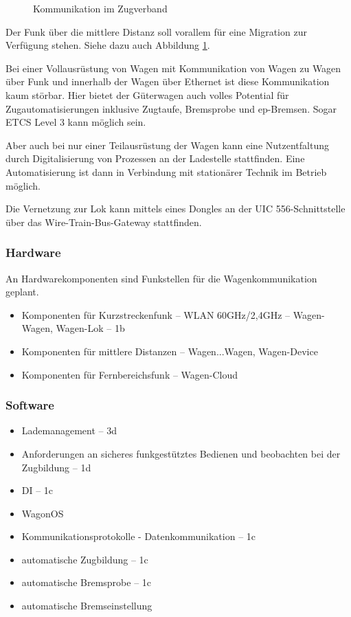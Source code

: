 \begin{figure}[hbt]
    \centering
    
    \caption{Kommunikation im Zugverband\cite{autonBetrieb}}
    \label{fig:Zugkomm}
\end{figure}
Der Funk über die mittlere Distanz soll vorallem für eine Migration zur Verfügung stehen. Siehe dazu auch Abbildung \ref{fig:Zugkomm}.\par
Bei einer Vollausrüstung von Wagen mit Kommunikation von Wagen zu Wagen über Funk und innerhalb der Wagen über Ethernet ist diese Kommunikation kaum störbar. Hier bietet der Güterwagen auch volles Potential für Zugautomatisierungen inklusive Zugtaufe, Bremsprobe und ep-Bremsen. Sogar ETCS Level 3 kann möglich sein.\par
Aber auch bei nur einer Teilausrüstung der Wagen kann eine Nutzentfaltung durch Digitalisierung von Prozessen an der Ladestelle stattfinden. Eine Automatisierung ist dann in Verbindung mit stationärer Technik im Betrieb möglich.\par
Die Vernetzung zur Lok kann mittels eines Dongles an der UIC 556-Schnittstelle über das Wire-Train-Bus-Gateway stattfinden.\par
\subsubsection{Hardware}
An Hardwarekomponenten sind Funkstellen für die Wagenkommunikation geplant.
\begin{itemize}
    \item Komponenten für Kurzstreckenfunk -- WLAN 60GHz/2,4GHz -- Wagen-Wagen, Wagen-Lok -- 1b
    \item Komponenten für mittlere Distanzen -- Wagen...Wagen, Wagen-Device
    \item Komponenten für Fernbereichsfunk -- Wagen-Cloud
\end{itemize}
\subsubsection{Software}
\begin{itemize}
    \item Lademanagement \label{sec:Lademanagment} -- 3d
    \item Anforderungen an sicheres funkgestütztes Bedienen und beobachten bei der Zugbildung -- 1d
    \item DI -- 1c
    \item \gls{WagonOS}
    \item Kommunikationsprotokolle - Datenkommunikation -- 1c
    \item automatische Zugbildung -- 1c
    \item automatische Bremsprobe -- 1c
    \item automatische Bremseinstellung
\end{itemize}